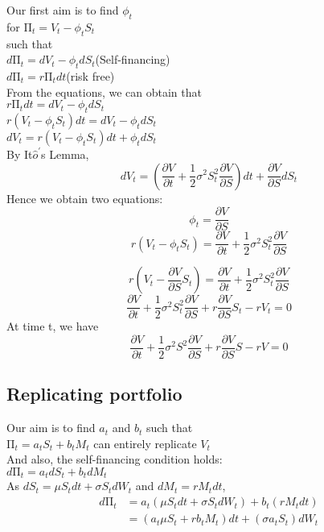 \begin{center}
Our first aim is to find $\phi_{t}$\\[1mm]
for $\mathrm{\Pi}_{t} = V_{t} - \phi_{t}S_{t}$\\[3mm]
such that\\[1mm]
$d\mathrm{\Pi}_{t} = dV_{t} - \phi_{t}dS_{t}$(Self-financing)\\[1mm]
$d\mathrm{\Pi}_{t} = r\mathrm{\Pi}_{t}dt$(risk free)\\[3mm]
From the equations, we can obtain that\\[1mm]
$r\mathrm{\Pi}_{t}dt = dV_{t} - \phi_{t}dS_{t}$\\[1mm]
$r(V_{t} - \phi_{t}S_{t})dt = dV_{t} - \phi_{t}dS_{t}$\\[1mm]
$dV_{t}  = r(V_{t} - \phi_{t}S_{t})dt + \phi_{t}dS_{t}$\\[1mm]
By It$\hat{o}^{\prime}$s Lemma, $$dV_{t} = (\frac{\partial V}{\partial t}+\frac{1}{2}\sigma^{2}S_{t}^{2}\frac{\partial V}{\partial S})dt + \frac{\partial V}{\partial S}dS_{t}$$
Hence we obtain two equations:
$$\phi_{t} = \frac{\partial V}{\partial S}$$
$$r(V_{t} - \phi_{t}S_{t}) = \frac{\partial V}{\partial t}+\frac{1}{2}\sigma^{2}S_{t}^{2}\frac{\partial V}{\partial S}$$
\end{center}

\begin{center}
$$r(V_{t} - \frac{\partial V}{\partial S}S_{t}) = \frac{\partial V}{\partial t}+\frac{1}{2}\sigma^{2}S_{t}^{2}\frac{\partial V}{\partial S}$$
$$\frac{\partial V}{\partial t}+\frac{1}{2}\sigma^{2}S_{t}^{2}\frac{\partial V}{\partial S} + r\frac{\partial V}{\partial S}S_{t} - rV_{t} = 0$$
At time t, we have
$$\frac{\partial V}{\partial t}+\frac{1}{2}\sigma^{2}S^{2}\frac{\partial V}{\partial S} + r\frac{\partial V}{\partial S}S - rV = 0$$
\end{center}
\newpage

\subsection{Replicating portfolio}

\begin{center}
Our aim is to find $a_{t}$ and $b_{t}$ such that\\[2mm]
$\mathrm{\Pi}_{t} = a_{t}S_{t} + b_{t}M_{t}$ can entirely replicate $V_{t}$\\[2mm]
And also, the self-financing condition holds:\\[2mm]
$d\mathrm{\Pi}_{t} = a_{t}dS_{t} + b_{t}dM_{t}$\\[5mm]
As $dS_{t} = \mu S_{t}dt + \sigma S_{t}dW_{t}$ and $dM_{t}  = rM_{t}dt$,
\begin{equation*}
\begin{split}
d\mathrm{\Pi}_{t} 
&= a_{t}(\mu S_{t}dt + \sigma S_{t}dW_{t}) + b_{t}(rM_{t}dt)\\
&= (a_{t}\mu S_{t} + rb_{t}M_{t})dt + (\sigma a_{t}S_{t})dW_{t}\\
\end{split}
\end{equation*}
\end{center}

